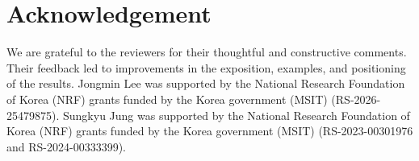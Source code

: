\documentclass[preprint]{imsart}
\theoremstyle{plain}
\theoremstyle{remark}
\begin{document}
\section*{Acknowledgement}  
We are grateful to the reviewers for their thoughtful and constructive comments. Their feedback led to improvements in the exposition, examples, and positioning of the results. Jongmin Lee was supported by the National Research Foundation of Korea (NRF) grants funded by the Korea government (MSIT) (RS-2026-25479875). Sungkyu Jung was supported by the National Research Foundation of Korea (NRF) grants funded by the Korea government (MSIT) (RS-2023-00301976 and RS-2024-00333399).











\end{document}
